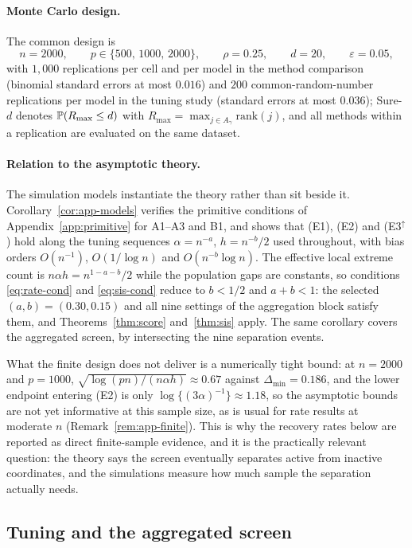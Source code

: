 \documentclass[bj,authoryear]{imsart}
\theoremstyle{plain}
\newcommand{\A}{A}\newcommand{\I}{I_\varepsilon}
\begin{document}
\paragraph{Monte Carlo design.}
The common design is
\[
 n=2000,\qquad p\in\{500,\,1000,\,2000\},\qquad \rho=0.25,
 \qquad d=20,\qquad \varepsilon=0.05,
\]
with $1{,}000$ replications per cell and per model in the method
comparison (binomial standard errors at most $0.016$) and $200$
common-random-number replications per model in the tuning study
(standard errors at most $0.036$); Sure-$d$ denotes
$\mathbb P(R_{\max}\le d)$ with $R_{\max}=\max_{j\in\A_\gamma}\mathrm{rank}(j)$,
and all methods within a replication are evaluated on the same dataset.

\paragraph{Relation to the asymptotic theory.}
The simulation models instantiate the theory rather than sit beside it.
Corollary~\ref{cor:app-models} verifies the primitive conditions of
Appendix~\ref{app:primitive} for A1--A3 and B1, and shows that (E1),
(E2) and (E3$^\uparrow$) hold along the tuning sequences
$\alpha=n^{-a}$, $h=n^{-b}/2$ used throughout, with bias orders
$O(n^{-1})$, $O(1/\log n)$ and $O(n^{-b}\log n)$. The effective local
extreme count is $n\alpha h=n^{1-a-b}/2$ while the population gaps are
constants, so conditions \eqref{eq:rate-cond} and \eqref{eq:sis-cond}
reduce to $b<1/2$ and $a+b<1$: the selected $(a,b)=(0.30,0.15)$ and all
nine settings of the aggregation block satisfy them, and
Theorems~\ref{thm:score} and~\ref{thm:sis} apply. The same corollary
covers the aggregated screen, by intersecting the nine separation
events.

What the finite design does not deliver is a numerically tight bound:
at $n=2000$ and $p=1000$, $\sqrt{\log(pn)/(n\alpha h)}\approx0.67$
against $\Delta_{\min}=0.186$, and the lower endpoint entering (E2) is
only $\log\{(3\alpha)^{-1}\}\approx1.18$, so the asymptotic bounds are
not yet informative at this sample size, as is usual for rate results at
moderate $n$ (Remark~\ref{rem:app-finite}). This is why the recovery rates below are reported as
direct finite-sample evidence, and it is the practically relevant
question: the theory says the screen eventually separates active from
inactive coordinates, and the simulations measure how much sample the
separation actually needs.

\subsection{Tuning and the aggregated screen}\label{sec:tuning}
\end{document}
